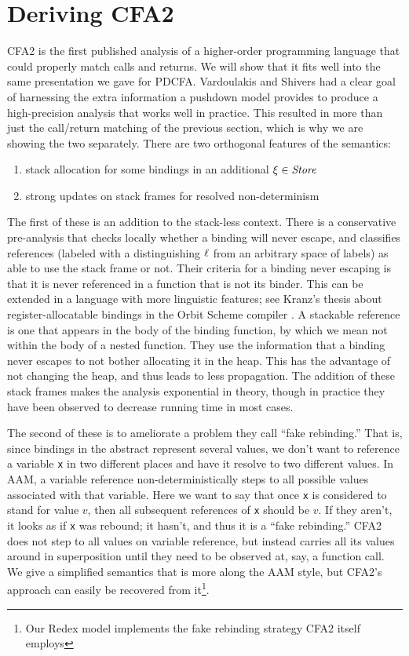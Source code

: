 \section{Deriving CFA2}
\label{sec:cfa2}

CFA2 is the first published analysis of a higher-order programming language that could properly match calls and returns.
%
We will show that it fits well into the same presentation we gave for PDCFA.
%
Vardoulakis and Shivers had a clear goal of harnessing the extra information a pushdown model provides to produce a high-precision analysis that works well in practice.
%
This resulted in more than just the call/return matching of the previous section, which is why we are showing the two separately.
%
There are two orthogonal features of the semantics:
\begin{enumerate}
\item{stack allocation for some bindings in an additional $\xi \in \mathit{Store}$}
\item{strong updates on stack frames for resolved non-determinism}
\end{enumerate}
The first of these is an addition to the stack-less context.
%
There is a conservative pre-analysis that checks locally whether a binding will never escape, and classifies references (labeled with a distinguishing $\ell$ from an arbitrary space of labels) as able to use the stack frame or not.
%
Their criteria for a binding never escaping is that it is never referenced in a function that is not its binder.
%
This can be extended in a language with more linguistic features; see Kranz's thesis about register-allocatable bindings in the Orbit Scheme compiler \citep{ianjohnson:kranz:thesis:1988}.
%
A stackable reference is one that appears in the body of the binding function, by which we mean not within the body of a nested function.
%
They use the information that a binding never escapes to not bother allocating it in the heap.
%
This has the advantage of not changing the heap, and thus leads to less propagation.
%
The addition of these stack frames makes the analysis exponential in theory, though in practice they have been observed to decrease running time in most cases.

The second of these is to ameliorate a problem they call ``fake rebinding.''
%
That is, since bindings in the abstract represent several values, we don't want to reference a variable \texttt{x} in two different places and have it resolve to two different values.
%
In AAM, a variable reference non-deterministically steps to all possible values associated with that variable.
%
Here we want to say that once \texttt{x} is considered to stand for value $v$, then all subsequent references of \texttt{x} should be $v$.
%
If they aren't, it looks as if \texttt{x} was rebound; it hasn't, and thus it is a ``fake rebinding.''
%
CFA2 does not step to all values on variable reference, but instead carries all its values around in superposition until they need to be observed at, say, a function call.
%
We give a simplified semantics that is more along the AAM style, but CFA2's approach can easily be recovered from it\footnote{Our Redex model implements the fake rebinding strategy CFA2 itself employs}.

